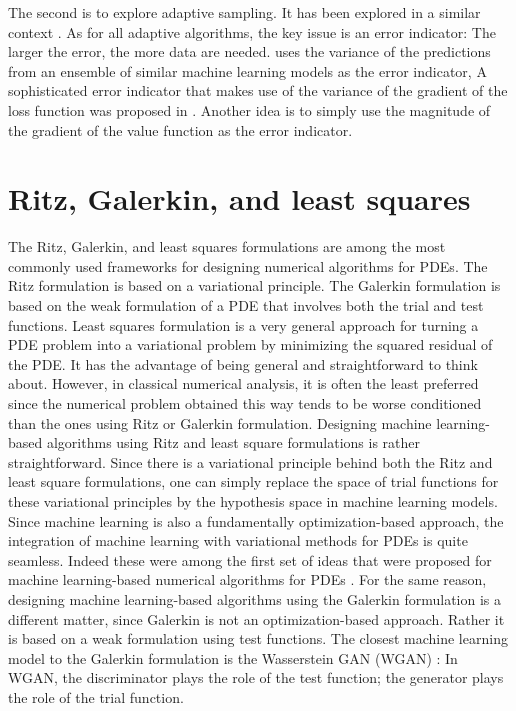 \documentclass[12pt]{article}
\theoremstyle{definition}
\begin{document}
 The second is to explore adaptive sampling. %
 It has been explored in a similar context  \cite{zhang2020dp}.
 As for all adaptive algorithms, the key issue is an  error indicator: The larger the error, the more data are needed.
 \cite{zhang2020dp} uses the variance of the predictions from an ensemble of similar machine learning models as the error indicator,
 A  sophisticated error indicator that makes use of the variance of the gradient of the loss function was proposed in
 \cite{nakamura2019adaptive}.   Another idea is to simply use the magnitude of the gradient of the value function as the error indicator.


\section{Ritz,  Galerkin, and least squares}
The Ritz, Galerkin, and least squares formulations are among the most commonly
used frameworks for designing numerical algorithms for PDEs.
The Ritz formulation is based on a variational principle.
%
%
%
The Galerkin formulation is based on the weak formulation of a PDE that involves
 both the trial and test functions.
Least squares formulation is a very general approach for turning a PDE problem
into a variational problem by minimizing the squared residual of the PDE. 
It has the advantage of being general and straightforward to think about.
However, in classical numerical analysis, it is often the least preferred since the numerical
problem obtained this way tends to be worse conditioned than the ones using
Ritz or Galerkin formulation.
Designing machine learning-based algorithms using Ritz and least square formulations is rather
straightforward.  Since there is a variational principle behind both the Ritz and
least square formulations, one can simply replace the space of trial functions for
these variational principles by the hypothesis space in machine learning models.
Since machine learning is also a fundamentally optimization-based approach, the
integration of machine learning with variational methods for PDEs  is quite seamless.
Indeed these were among the first set of ideas that were proposed for machine learning-based
numerical algorithms for PDEs \cite{carleo2017solving,E2018deep,Sirignano2018dgm}.
For the same reason, designing machine learning-based algorithms using the Galerkin formulation is a different
matter, since Galerkin is not an optimization-based approach.  Rather it is based
on a weak formulation using test functions. 
The closest machine learning model to the Galerkin formulation is the Wasserstein GAN
(WGAN)
\cite{arjovsky2017towards,arjovsky2017wgan}: In WGAN, the discriminator plays the role of the test function;
the generator plays the role of the trial function. 
%
%
%
%
\end{document}

